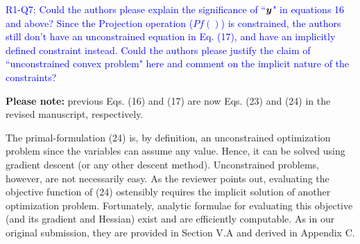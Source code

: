 \textcolor{blue}{R1-Q7: Could the authors please explain the significance of
``${\bm{y}}$" in equations 16 and above? Since the Projection operation ($Pf()$)
is constrained, the authors still don't have an unconstrained equation in Eq.
(17), and have an implicitly defined constraint instead. Could the authors
please justify the claim of ``unconstrained convex problem" here and comment on
the implicit nature of the constraints?}

\textbf{Please note:} previous Eqs. (16) and (17) are now Eqs. (23) and (24)
in the revised manuscript, respectively.

The primal-formulation (24) is, by definition, an unconstrained optimization
problem since the variables can assume any value. Hence, it can be solved using
gradient descent (or any other descent method). Unconstrained problems, however,
are not necessarily easy. As the reviewer points out, evaluating the objective
function of (24) ostensibly requires the implicit solution of another
optimization problem. Fortunately, analytic formulae for evaluating this
objective (and its gradient and Hessian) exist and are efficiently computable.
As in our original submission, they are provided  in Section V.A and derived in
Appendix C.
\vspace{5mm}

